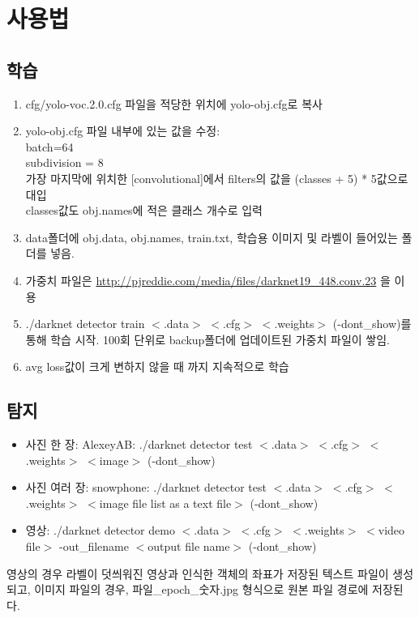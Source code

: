 \documentclass[a4paper,12pt]{article}
\begin{document}
\section{사용법}
\subsection{학습}
\begin{enumerate}
	\item cfg/yolo-voc.2.0.cfg 파일을 적당한 위치에 yolo-obj.cfg로 복사
	\item yolo-obj.cfg 파일 내부에 있는 값을 수정: 
		\\batch=64
		\\subdivision = 8
		\\가장 마지막에 위치한 [convolutional]에서 filters의 값을 (classes + 5) * 5값으로 대입
		\\classes값도 obj.names에 적은 클래스 개수로 입력
	\item data폴더에 obj.data, obj.names, train.txt, 학습용 이미지 및 라벨이 들어있는 폴더를 넣음.
	\item 가중치 파일은 \url{http://pjreddie.com/media/files/darknet19\_448.conv.23} 을 이용
	\item ./darknet detector train $<$.data$>$ $<$.cfg$>$ $<$.weights$>$ (-dont\_show)를 통해 학습 시작. 100회 단위로 backup폴더에 업데이트된 가중치 파일이 쌓임.
	\item avg loss값이 크게 변하지 않을 때 까지 지속적으로 학습
\end{enumerate}

\subsection{탐지}
\begin{itemize}
	\item 사진 한 장: AlexeyAB: ./darknet detector test $<$.data$>$ $<$.cfg$>$ $<$.weights$>$ $<$image$>$ (-dont\_show)
	\item 사진 여러 장: snowphone: ./darknet detector test $<$.data$>$ $<$.cfg$>$ $<$.weights$>$ $<$image file list as a text file$>$ (-dont\_show)
	\item 영상: ./darknet detector demo $<$.data$>$ $<$.cfg$>$ $<$.weights$>$ $<$video file$>$ -out\_filename $<$output file name$>$ (-dont\_show)
\end{itemize}

영상의 경우 라벨이 덧씌워진 영상과 인식한 객체의 좌표가 저장된 텍스트 파일이 생성되고, 이미지 파일의 경우, 파일\_epoch\_숫자.jpg 형식으로 원본 파일 경로에 저장된다.
\end{document}
